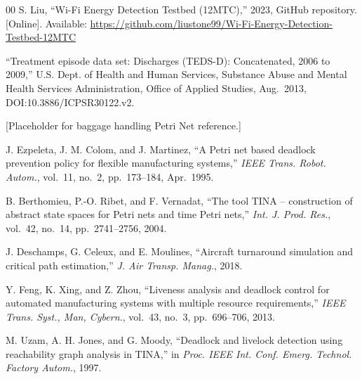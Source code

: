 \documentclass[conference]{IEEEtran}
\begin{document}
\begin{thebibliography}{00}
S. Liu, ``Wi-Fi Energy Detection Testbed (12MTC),'' 2023, GitHub repository.
[Online]. Available:
\url{https://github.com/liustone99/Wi-Fi-Energy-Detection-Testbed-12MTC}

``Treatment episode data set: Discharges (TEDS-D): Concatenated, 2006 to
2009,'' U.S. Dept. of Health and Human Services, Substance Abuse and Mental
Health Services Administration, Office of Applied Studies, Aug.~2013,
DOI:10.3886/ICPSR30122.v2.

[Placeholder for baggage handling Petri Net reference.]

J. Ezpeleta, J. M. Colom, and J. Martinez, ``A Petri net based deadlock
prevention policy for flexible manufacturing systems,''
\textit{IEEE Trans. Robot. Autom.}, vol.~11, no.~2, pp.~173--184, Apr.~1995.

B. Berthomieu, P.-O. Ribet, and F. Vernadat, ``The tool TINA -- construction of
abstract state spaces for Petri nets and time Petri nets,''
\textit{Int. J. Prod. Res.}, vol.~42, no.~14, pp.~2741--2756, 2004.

J. Deschamps, G. Celeux, and E. Moulines, ``Aircraft turnaround simulation and
critical path estimation,'' \textit{J. Air Transp. Manag.}, 2018.

Y. Feng, K. Xing, and Z. Zhou, ``Liveness analysis and deadlock control for
automated manufacturing systems with multiple resource requirements,''
\textit{IEEE Trans. Syst., Man, Cybern.}, vol.~43, no.~3, pp.~696--706, 2013.

M. Uzam, A. H. Jones, and G. Moody, ``Deadlock and livelock detection using
reachability graph analysis in TINA,'' in \textit{Proc. IEEE Int. Conf.
Emerg. Technol. Factory Autom.}, 1997.

\end{thebibliography}
\end{document}
